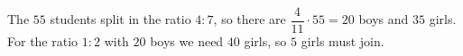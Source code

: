 The $55$ students split in the ratio $4:7$, so there are $\dfrac{4}{11}\cdot55=20$ boys and $35$ girls. For the ratio $1:2$ with $20$ boys we need $40$ girls, so $\boxed{5}$ girls must join.
